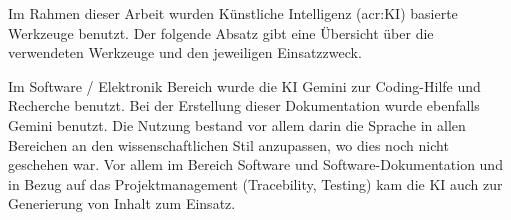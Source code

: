 \setcounter{chapter}{1}

Im Rahmen dieser Arbeit wurden Künstliche Intelligenz (\acrshort{acr:KI}) basierte Werkzeuge benutzt. Der folgende Absatz gibt eine Übersicht über die verwendeten Werkzeuge und den jeweiligen Einsatzzweck.

Im Software / Elektronik Bereich wurde die KI Gemini zur Coding-Hilfe und Recherche benutzt. Bei der Erstellung dieser Dokumentation wurde ebenfalls Gemini benutzt. Die Nutzung bestand vor allem darin die Sprache in allen Bereichen an den wissenschaftlichen Stil anzupassen, wo dies noch nicht geschehen war. Vor allem im Bereich Software und Software-Dokumentation und in Bezug auf das Projektmanagement (Tracebility, Testing) kam die KI auch zur Generierung von Inhalt zum Einsatz.

